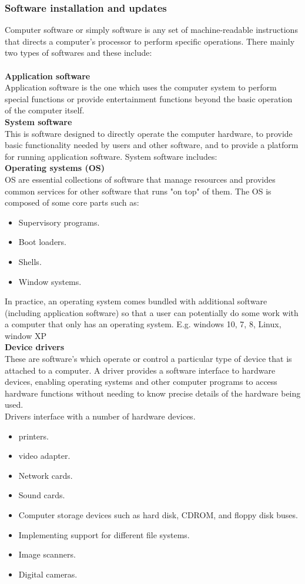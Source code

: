 \subsubsection{Software installation and updates}
Computer software or simply software is any set of machine-readable instructions that directs a computer's processor to perform specific operations. There mainly two types of softwares and these include:\\ \\
\textbf{Application software}\\
Application software is the one which uses the computer system to perform special functions or provide entertainment functions beyond the basic operation of the computer itself. \\
\textbf{System software}\\
This is software designed to directly operate the computer hardware, to provide basic functionality needed by users and other software, and to provide a platform for running application software. System software includes: \\
\textbf{Operating systems (OS)}\\
 OS are essential collections of software that manage resources and provides common services for other software that runs "on top" of them. The OS is composed of some core parts such as:\\
 \begin{itemize}
 \item Supervisory programs.
 \item Boot loaders. 
 \item Shells. 
 \item Window systems.
 \end{itemize}
In practice, an operating system comes bundled with additional software (including application software) so that a user can potentially do some work with a computer that only has an operating system. E.g. windows 10, 7, 8, Linux, window XP\\
\textbf{Device drivers}\\
These are software’s which operate or control a particular type of device that is attached to a computer. A driver provides a software interface to hardware devices, enabling operating systems and other computer programs to access hardware functions without needing to know precise details of the hardware being used. \\
Drivers interface with a number of hardware devices. \\
\begin{itemize}
\item printers.
\item video adapter.
\item Network cards.
\item Sound cards.
\item Computer storage devices such as hard disk, CD­ROM, and floppy disk buses.
\item Implementing support for different file systems.
\item Image scanners.
\item Digital cameras. 
\end{itemize}

